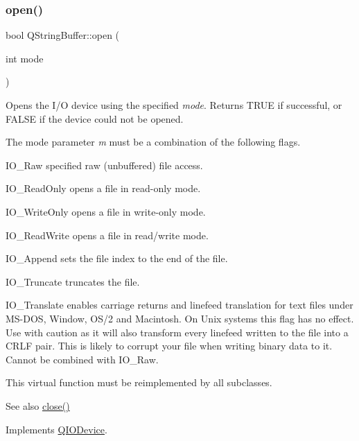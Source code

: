 \subsubsection{\texorpdfstring{open()}{open()}}
{\footnotesize\ttfamily bool Q\+String\+Buffer\+::open (\begin{DoxyParamCaption}\item[{int}]{mode }\end{DoxyParamCaption})\hspace{0.3cm}{\ttfamily [virtual]}}

Opens the I/O device using the specified {\itshape mode}. Returns T\+R\+UE if successful, or F\+A\+L\+SE if the device could not be opened.

The mode parameter {\itshape m} must be a combination of the following flags. 
\begin{DoxyItemize}
\item {\ttfamily I\+O\+\_\+\+Raw} specified raw (unbuffered) file access. 
\item {\ttfamily I\+O\+\_\+\+Read\+Only} opens a file in read-\/only mode. 
\item {\ttfamily I\+O\+\_\+\+Write\+Only} opens a file in write-\/only mode. 
\item {\ttfamily I\+O\+\_\+\+Read\+Write} opens a file in read/write mode. 
\item {\ttfamily I\+O\+\_\+\+Append} sets the file index to the end of the file. 
\item {\ttfamily I\+O\+\_\+\+Truncate} truncates the file. 
\item {\ttfamily I\+O\+\_\+\+Translate} enables carriage returns and linefeed translation for text files under M\+S-\/\+D\+OS, Window, O\+S/2 and Macintosh. On Unix systems this flag has no effect. Use with caution as it will also transform every linefeed written to the file into a C\+R\+LF pair. This is likely to corrupt your file when writing binary data to it. Cannot be combined with {\ttfamily I\+O\+\_\+\+Raw}. 
\end{DoxyItemize}

This virtual function must be reimplemented by all subclasses.

\begin{DoxySeeAlso}{See also}
\mbox{\hyperlink{class_q_string_buffer_aabc8736ce1f90cd66212c5a6b2e166ea}{close()}} 
\end{DoxySeeAlso}


Implements \mbox{\hyperlink{class_q_i_o_device_ae4046ae7bf4d4cee1010239973314e42}{Q\+I\+O\+Device}}.

